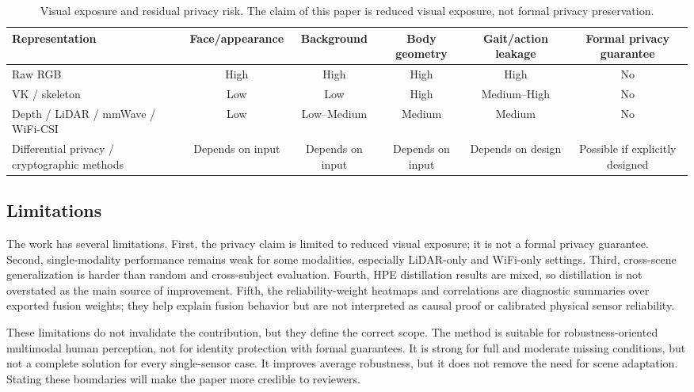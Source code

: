 \documentclass[preprint,12pt]{elsarticle}
\begin{document}
\begin{table}[t]
\centering
\caption{Visual exposure and residual privacy risk. The claim of this paper is reduced visual exposure, not formal privacy preservation.}
\label{tab:privacy_exposure}
\begin{adjustbox}{width=\textwidth}
\begin{tabular}{lccccc}
\toprule
Representation & Face/appearance & Background & Body geometry & Gait/action leakage & Formal privacy guarantee \\
\midrule
Raw RGB & High & High & High & High & No \\
VK / skeleton & Low & Low & High & Medium--High & No \\
Depth / LiDAR / mmWave / WiFi-CSI & Low & Low--Medium & Medium & Medium & No \\
Differential privacy / cryptographic methods & Depends on input & Depends on input & Depends on input & Depends on design & Possible if explicitly designed \\
\bottomrule
\end{tabular}
\end{adjustbox}
\end{table}

\subsection{Limitations}

The work has several limitations. First, the privacy claim is limited to reduced visual exposure; it is not a formal privacy guarantee. Second, single-modality performance remains weak for some modalities, especially LiDAR-only and WiFi-only settings. Third, cross-scene generalization is harder than random and cross-subject evaluation. Fourth, HPE distillation results are mixed, so distillation is not overstated as the main source of improvement. Fifth, the reliability-weight heatmaps and correlations are diagnostic summaries over exported fusion weights; they help explain fusion behavior but are not interpreted as causal proof or calibrated physical sensor reliability.

These limitations do not invalidate the contribution, but they define the correct scope. The method is suitable for robustness-oriented multimodal human perception, not for identity protection with formal guarantees. It is strong for full and moderate missing conditions, but not a complete solution for every single-sensor case. It improves average robustness, but it does not remove the need for scene adaptation. Stating these boundaries will make the paper more credible to reviewers.
\end{document}
